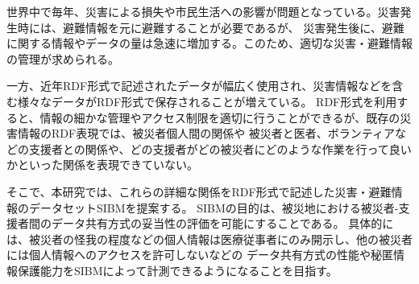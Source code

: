 ﻿
世界中で毎年、災害による損失や市民生活への影響が問題となっている。災害発生時には、避難情報を元に避難することが必要であるが、
災害発生後に、避難に関する情報やデータの量は急速に増加する。このため、適切な災害・避難情報の管理が求められる。

一方、近年RDF形式で記述されたデータが幅広く使用され、災害情報などを含む様々なデータがRDF形式で保存されることが増えている。
RDF形式を利用すると、情報の細かな管理やアクセス制限を適切に行うことができるが、既存の災害情報のRDF表現では、被災者個人間の関係や
被災者と医者、ボランティアなどの支援者との関係や、どの支援者がどの被災者にどのような作業を行って良いかといった関係を表現できていない。

そこで、本研究では、これらの詳細な関係をRDF形式で記述した災害・避難情報のデータセットSIBMを提案する。
SIBMの目的は、被災地における被災者-支援者間のデータ共有方式の妥当性の評価を可能にすることである。
具体的には、被災者の怪我の程度などの個人情報は医療従事者にのみ開示し、他の被災者には個人情報へのアクセスを許可しないなどの
データ共有方式の性能や秘匿情報保護能力をSIBMによって計測できるようになることを目指す。